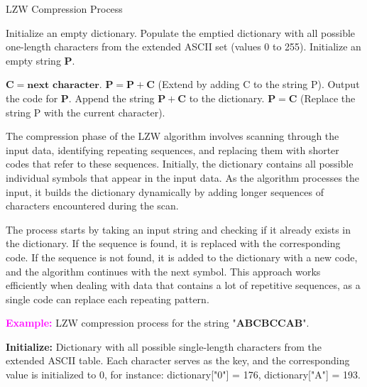 \begin{algorithm}[H]
	\caption{LZW Compression Process} 
	\begin{algorithmic}[1]
\State Initialize an empty dictionary.
\State Populate the emptied dictionary with all possible one-length characters from the extended ASCII set (values 0 to 255).
\State Initialize an empty string $\mathbf{P}$.

    \State $\mathbf{C = \text{next character}}$.
        \State $\mathbf{P = P + C}$ (Extend by adding C to the string P).
    \Else
        \State Output the code for $\mathbf{P}$.
        \State Append the string $\mathbf{P + C}$ to the dictionary.
        \State $\mathbf{P = C}$ (Replace the string P with the current character).
    \EndIf
\EndWhile
	\end{algorithmic} 
\end{algorithm}

\vspace{10pt}

The compression phase of the LZW algorithm involves scanning through the input data, identifying repeating sequences, and replacing them with shorter codes that refer to these sequences. Initially, the dictionary contains all possible individual symbols that appear in the input data. As the algorithm processes the input, it builds the dictionary dynamically by adding longer sequences of characters encountered during the scan.

\vspace{10pt}

The process starts by taking an input string and checking if it already exists in the dictionary. If the sequence is found, it is replaced with the corresponding code. If the sequence is not found, it is added to the dictionary with a new code, and the algorithm continues with the next symbol. This approach works efficiently when dealing with data that contains a lot of repetitive sequences, as a single code can replace each repeating pattern.

\vspace{10pt}

\textcolor{magenta}{\textbf{Example:}} LZW compression process for the string "\textcolor{Tue-red}{\textbf{ABCBCCAB}}".

\vspace{10pt}

\textbf{Initialize:} Dictionary with all possible single-length characters from the extended ASCII table. Each character serves as the key, and the corresponding value is initialized to 0, for instance: dictionary["0"] = 176, dictionary["A"] = 193.

